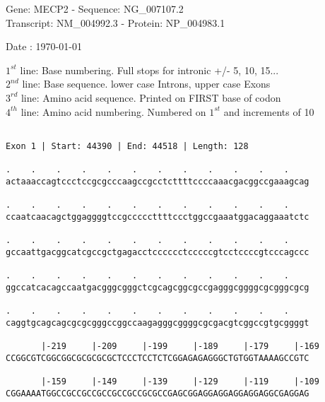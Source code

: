 \documentclass{article}
\begin{document}
\begin{center}
\begin{large}
Gene: MECP2 - Sequence: NG\_007107.2\\
Transcript: NM\_004992.3 - Protein: NP\_004983.1
 
 Date : \today
\end{large}
\end{center}
$1^{st}$ line: Base numbering. Full stops for intronic +/- 5, 10, 15...\\
$2^{nd}$ line: Base sequence. lower case Introns, upper case Exons\\
$3^{rd}$ line: Amino acid sequence. Printed on FIRST base of codon\\
$4^{th}$ line: Amino acid numbering. Numbered on $1^{st}$ and increments of 10\\
 \begin{Verbatim}
 
Exon 1 | Start: 44390 | End: 44518 | Length: 128
 
.    .    .    .    .    .    .    .    .    .    .    .    
actaaaccagtccctccgcgcccaagccgcctcttttccccaaacgacggccgaaagcag
                                                            
.    .    .    .    .    .    .    .    .    .    .    .    
ccaatcaacagctggaggggtccgcccccttttccctggccgaaatggacaggaaatctc
                                                            
.    .    .    .    .    .    .    .    .    .    .    .    
gccaattgacggcatcgccgctgagacctcccccctcccccgtcctccccgtcccagccc
                                                            
.    .    .    .    .    .    .    .    .    .    .    .    
ggccatcacagccaatgacgggcgggctcgcagcggcgccgagggcggggcgcgggcgcg
                                                            
.    .    .    .    .    .    .    .    .    .    .    .    
caggtgcagcagcgcgcgggccggccaagagggcggggcgcgacgtcggccgtgcggggt
                                                            
       |-219     |-209     |-199     |-189     |-179     |-169
CCGGCGTCGGCGGCGCGCGCGCTCCCTCCTCTCGGAGAGAGGGCTGTGGTAAAAGCCGTC
                                                            
       |-159     |-149     |-139     |-129     |-119     |-109
CGGAAAATGGCCGCCGCCGCCGCCGCCGCGCCGAGCGGAGGAGGAGGAGGAGGCGAGGAG
                                                            

\end{Verbatim}
\end{document}
